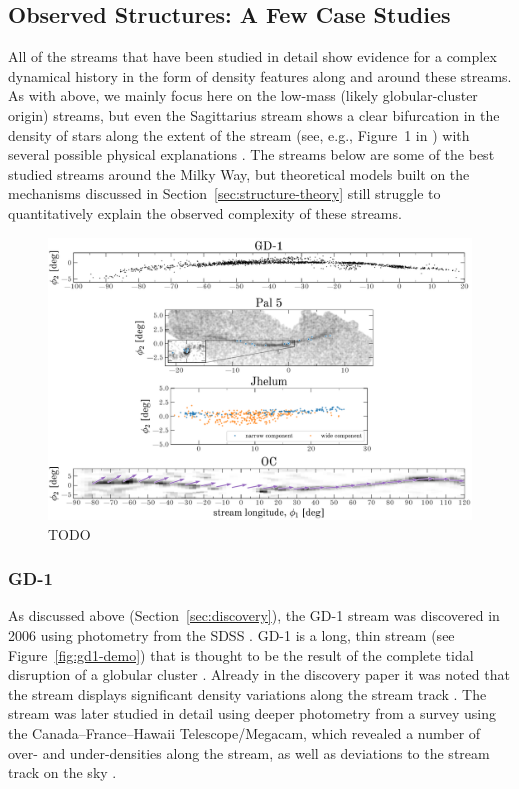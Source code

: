 \documentclass[final,5p,times,twocolumn,authoryear]{elsarticle}
\begin{document}
\subsection{Observed Structures: A Few Case Studies}
\label{sec:structure-obs}

All of the streams that have been studied in detail show evidence for a complex
dynamical history in the form of density features along and around these streams.
As with above, we mainly focus here on the low-mass (likely globular-cluster origin)
streams, but even the Sagittarius stream shows a clear bifurcation in the density of
stars along the extent of the stream (see, e.g., Figure~1 in \citealt{belokurov:2006})
with several possible physical explanations \citep[e.g.,][]{penarrubia:2010,
vasiliev:2020, vasiliev:2021}.
The streams below are some of the best studied streams around the Milky Way, but
theoretical models built on the mechanisms discussed in
Section~\ref{sec:structure-theory} still struggle to quantitatively explain the observed
complexity of these streams.

\begin{figure}[t!]
    \centering
    \includegraphics[width=\textwidth]{figures/stream-density-structure.pdf}
    \caption{
        TODO
        \label{fig:four-obs-streams}
    }
\end{figure}

\subsubsection{GD-1}
\label{sec:gd1}

As discussed above (Section~\ref{sec:discovery}), the GD-1 stream was discovered in 2006
using photometry from the SDSS \citep{grillmair:2006-gd1}.
GD-1 is a long, thin stream (see Figure~\ref{fig:gd1-demo}) that is thought to be the
result of the complete tidal disruption of a globular cluster \citep{koposov:2010}.
Already in the discovery paper it was noted that the stream displays significant density
variations along the stream track \citep{grillmair:2006-gd1}.
The stream was later studied in detail using deeper photometry from a survey using the
Canada--France--Hawaii Telescope/Megacam, which revealed a number of over- and
under-densities along the stream, as well as deviations to the stream track
on the sky \citep{deboer:2018}.
\end{document}
